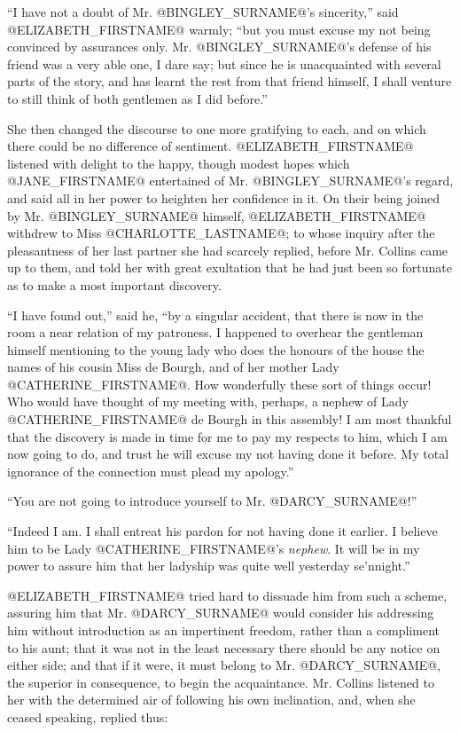 ``I have not a doubt of Mr. @BINGLEY_SURNAME@'s sincerity,'' said @ELIZABETH_FIRSTNAME@ warmly;
``but you must excuse my not being convinced by assurances only. Mr.
@BINGLEY_SURNAME@'s defense of his friend was a very able one, I dare say; but
since he is unacquainted with several parts of the story, and has learnt
the rest from that friend himself, I shall venture to still think of
both gentlemen as I did before.''

She then changed the discourse to one more gratifying to each, and on
which there could be no difference of sentiment. @ELIZABETH_FIRSTNAME@ listened with
delight to the happy, though modest hopes which @JANE_FIRSTNAME@ entertained of Mr.
@BINGLEY_SURNAME@'s regard, and said all in her power to heighten her confidence
in it. On their being joined by Mr. @BINGLEY_SURNAME@ himself, @ELIZABETH_FIRSTNAME@ withdrew
to Miss @CHARLOTTE_LASTNAME@; to whose inquiry after the pleasantness of her last
partner she had scarcely replied, before Mr. Collins came up to them,
and told her with great exultation that he had just been so fortunate as
to make a most important discovery.

``I have found out,'' said he, ``by a singular accident, that there is now
in the room a near relation of my patroness. I happened to overhear the
gentleman himself mentioning to the young lady who does the honours of
the house the names of his cousin Miss de Bourgh, and of her mother Lady
@CATHERINE_FIRSTNAME@. How wonderfully these sort of things occur! Who would have
thought of my meeting with, perhaps, a nephew of Lady @CATHERINE_FIRSTNAME@ de
Bourgh in this assembly! I am most thankful that the discovery is made
in time for me to pay my respects to him, which I am now going to
do, and trust he will excuse my not having done it before. My total
ignorance of the connection must plead my apology.''

``You are not going to introduce yourself to Mr. @DARCY_SURNAME@!''

``Indeed I am. I shall entreat his pardon for not having done it earlier.
I believe him to be Lady @CATHERINE_FIRSTNAME@'s \textit{nephew}. It will be in my power to
assure him that her ladyship was quite well yesterday se'nnight.''

@ELIZABETH_FIRSTNAME@ tried hard to dissuade him from such a scheme, assuring him
that Mr. @DARCY_SURNAME@ would consider his addressing him without introduction
as an impertinent freedom, rather than a compliment to his aunt; that
it was not in the least necessary there should be any notice on either
side; and that if it were, it must belong to Mr. @DARCY_SURNAME@, the superior in
consequence, to begin the acquaintance. Mr. Collins listened to her
with the determined air of following his own inclination, and, when she
ceased speaking, replied thus:

